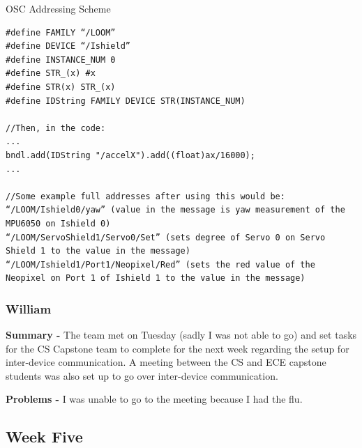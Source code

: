 \documentclass[onecolumn, draftclsnofoot,10pt, compsoc]{IEEEtran}
\begin{document}
\begin{listing}[H]   
\caption{OSC Addressing Scheme} 
\label{lst:osc_addressing}   

\begin{verbatim}
#define FAMILY “/LOOM”
#define DEVICE “/Ishield”
#define INSTANCE_NUM 0
#define STR_(x) #x
#define STR(x) STR_(x)
#define IDString FAMILY DEVICE STR(INSTANCE_NUM)

//Then, in the code:
...
bndl.add(IDString "/accelX").add((float)ax/16000);
...

//Some example full addresses after using this would be:
“/LOOM/Ishield0/yaw” (value in the message is yaw measurement of the MPU6050 on Ishield 0)
“/LOOM/ServoShield1/Servo0/Set” (sets degree of Servo 0 on Servo Shield 1 to the value in the message)
“/LOOM/Ishield1/Port1/Neopixel/Red” (sets the red value of the Neopixel on Port 1 of Ishield 1 to the value in the message)
\end{verbatim}

\end{listing}


\subsubsection*{William}
    \begin{adjustwidth}{2.5em}{0pt}
    \textbf{Summary -} The team met on Tuesday (sadly I was not able to go) and set tasks for the CS Capstone team to complete for the next week regarding the setup for inter-device communication. A meeting between the CS and ECE capstone students was also set up to go over inter-device communication. 
    
    \textbf{Problems -} I was unable to go to the meeting because I had the flu. 
    \end{adjustwidth}



\subsection{Week Five}
\end{document}

